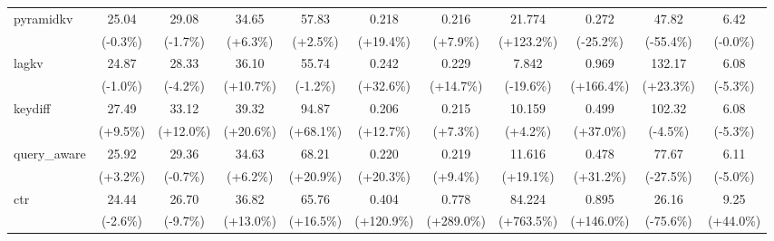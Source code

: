 \begin{table}[t]
{\begin{tabular}{l|cccccccccc}
    pyramidkv & 25.04 & 29.08 & 34.65 & 57.83 & 0.218 & 0.216 & 21.774 & 0.272 & 47.82 & 6.42 \\
     & {\tiny\color{green!60!black}(-0.3\%)} & {\tiny\color{green!60!black}(-1.7\%)} & {\tiny\color{red!70!black}(+6.3\%)} & {\tiny\color{red!70!black}(+2.5\%)} & {\tiny\color{red!70!black}(+19.4\%)} & {\tiny\color{red!70!black}(+7.9\%)} & {\tiny\color{red!70!black}(+123.2\%)} & {\tiny\color{green!60!black}(-25.2\%)} & {\tiny\color{red!70!black}(-55.4\%)} & {\tiny\color{green!60!black}(-0.0\%)} \\
    lagkv & 24.87 & 28.33 & 36.10 & 55.74 & 0.242 & 0.229 & 7.842 & 0.969 & 132.17 & 6.08 \\
     & {\tiny\color{green!60!black}(-1.0\%)} & {\tiny\color{green!60!black}(-4.2\%)} & {\tiny\color{red!70!black}(+10.7\%)} & {\tiny\color{green!60!black}(-1.2\%)} & {\tiny\color{red!70!black}(+32.6\%)} & {\tiny\color{red!70!black}(+14.7\%)} & {\tiny\color{green!60!black}(-19.6\%)} & {\tiny\color{red!70!black}(+166.4\%)} & {\tiny\color{green!60!black}(+23.3\%)} & {\tiny\color{green!60!black}(-5.3\%)} \\
    keydiff & 27.49 & 33.12 & 39.32 & 94.87 & 0.206 & 0.215 & 10.159 & 0.499 & 102.32 & 6.08 \\
     & {\tiny\color{red!70!black}(+9.5\%)} & {\tiny\color{red!70!black}(+12.0\%)} & {\tiny\color{red!70!black}(+20.6\%)} & {\tiny\color{red!70!black}(+68.1\%)} & {\tiny\color{red!70!black}(+12.7\%)} & {\tiny\color{red!70!black}(+7.3\%)} & {\tiny\color{red!70!black}(+4.2\%)} & {\tiny\color{red!70!black}(+37.0\%)} & {\tiny\color{red!70!black}(-4.5\%)} & {\tiny\color{green!60!black}(-5.3\%)} \\
    query\_aware & 25.92 & 29.36 & 34.63 & 68.21 & 0.220 & 0.219 & 11.616 & 0.478 & 77.67 & 6.11 \\
     & {\tiny\color{red!70!black}(+3.2\%)} & {\tiny\color{green!60!black}(-0.7\%)} & {\tiny\color{red!70!black}(+6.2\%)} & {\tiny\color{red!70!black}(+20.9\%)} & {\tiny\color{red!70!black}(+20.3\%)} & {\tiny\color{red!70!black}(+9.4\%)} & {\tiny\color{red!70!black}(+19.1\%)} & {\tiny\color{red!70!black}(+31.2\%)} & {\tiny\color{red!70!black}(-27.5\%)} & {\tiny\color{green!60!black}(-5.0\%)} \\
    ctr & 24.44 & 26.70 & 36.82 & 65.76 & 0.404 & 0.778 & 84.224 & 0.895 & 26.16 & 9.25 \\
     & {\tiny\color{green!60!black}(-2.6\%)} & {\tiny\color{green!60!black}(-9.7\%)} & {\tiny\color{red!70!black}(+13.0\%)} & {\tiny\color{red!70!black}(+16.5\%)} & {\tiny\color{red!70!black}(+120.9\%)} & {\tiny\color{red!70!black}(+289.0\%)} & {\tiny\color{red!70!black}(+763.5\%)} & {\tiny\color{red!70!black}(+146.0\%)} & {\tiny\color{red!70!black}(-75.6\%)} & {\tiny\color{red!70!black}(+44.0\%)} \\

\end{tabular}}
\end{table}
